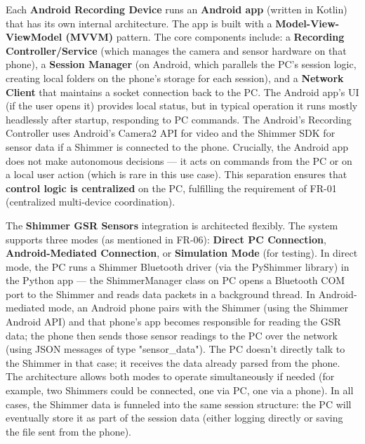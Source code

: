 \documentclass[11pt,a4paper]{report}
\begin{document}
Each \textbf{Android Recording Device} runs an \textbf{Android app} (written in
Kotlin) that has its own internal architecture. The app is built with a
\textbf{Model-View-ViewModel (MVVM)} pattern. The core components include: a
\textbf{Recording Controller/Service} (which manages the camera and sensor
hardware on that phone), a \textbf{Session Manager} (on Android, which
parallels the PC's session logic, creating local folders on the phone's
storage for each session), and a \textbf{Network Client} that maintains a
socket connection back to the PC. The Android app's UI (if the user
opens it) provides local status, but in typical operation it runs mostly
headlessly after startup, responding to PC commands. The Android's
Recording Controller uses Android's Camera2 API for video and the
Shimmer SDK for sensor data if a Shimmer is connected to the phone.
Crucially, the Android app does not make autonomous decisions --- it acts
on commands from the PC or on a local user action (which is rare in this
use case). This separation ensures that \textbf{control logic is centralized}
on the PC, fulfilling the requirement of FR-01 (centralized multi-device
coordination).

The \textbf{Shimmer GSR Sensors} integration is architected flexibly. The
system supports three modes (as mentioned in FR-06): \textbf{Direct PC
Connection}, \textbf{Android-Mediated Connection}, or \textbf{Simulation Mode}
(for testing). In direct mode, the PC runs a Shimmer Bluetooth driver
(via the PyShimmer library) in the Python app --- the ShimmerManager class on
PC opens a Bluetooth COM port to the Shimmer and reads data packets in a
background
thread\cite{GSRPPGMachineLearning2024}\cite{TopdonTC001}.
In Android-mediated mode, an Android phone pairs with the Shimmer (using
the Shimmer Android API) and that phone's app becomes responsible for
reading the GSR data; the phone then sends those sensor readings to the
PC over the network (using JSON messages of type
"sensor\_data").
The PC doesn't directly talk to the Shimmer in that case; it receives
the data already parsed from the phone. The architecture allows both
modes to operate simultaneously if needed (for example, two Shimmers
could be connected, one via PC, one via a phone). In all cases, the
Shimmer data is funneled into the same session structure: the PC will
eventually store it as part of the session data (either logging directly
or saving the file sent from the phone).
\end{document}

